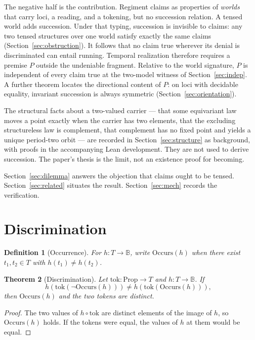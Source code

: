 \documentclass[11pt]{article}
\newtheorem{theorem}{Theorem}[section]
\newtheorem{definition}[theorem]{Definition}
\newcommand{\B}{\mathbb{B}}
\newcommand{\Occurs}{\mathrm{Occurs}}
\begin{document}
The negative half is the contribution. Regiment claims as properties of
\emph{worlds} that carry loci, a reading, and a tokening, but no succession
relation. A tensed world adds succession. Under that typing, succession is
invisible to claims: any two tensed structures over one world satisfy exactly
the same claims (Section~\ref{sec:obstruction}). It follows that no claim true
wherever its denial is discriminated can entail running. Temporal realization
therefore requires a premise \(P\) outside the undeniable fragment. Relative to
the world signature, \(P\) is independent of every claim true at the two-model
witness of Section~\ref{sec:indep}. A further theorem locates the directional
content of \(P\): on loci with decidable equality, invariant succession is
always symmetric (Section~\ref{sec:orientation}).

The structural facts about a two-valued carrier --- that some equivariant law
moves a point exactly when the carrier has two elements, that the excluding
structureless law is complement, that complement has no fixed point and yields
a unique period-two orbit --- are recorded in Section~\ref{sec:structure} as
background, with proofs in the accompanying Lean development. They are not used
to derive succession. The paper's thesis is the limit, not an existence proof
for becoming.

Section~\ref{sec:dilemma} answers the objection that claims ought to be tensed.
Section~\ref{sec:related} situates the result. Section~\ref{sec:mech} records
the verification.

\section{Discrimination}
\label{sec:discrimination}

\begin{definition}[Occurrence]
\label{def:occurs}
For \(h : T \to \B\), write \(\Occurs(h)\) when there exist \(t_1,t_2 \in T\)
with \(h(t_1) \neq h(t_2)\).
\end{definition}

\begin{theorem}[Discrimination]
\label{thm:discrimination}
Let \(\mathrm{tok} : \mathrm{Prop} \to T\) and \(h : T \to \B\). If
\[
h(\mathrm{tok}(\lnot\Occurs(h))) \neq h(\mathrm{tok}(\Occurs(h))),
\]
then \(\Occurs(h)\) and the two tokens are distinct.
\end{theorem}

\begin{proof}
The two values of \(h\circ\mathrm{tok}\) are distinct elements of the image of
\(h\), so \(\Occurs(h)\) holds. If the tokens were equal, the values of \(h\)
at them would be equal.
\end{proof}
\end{document}
